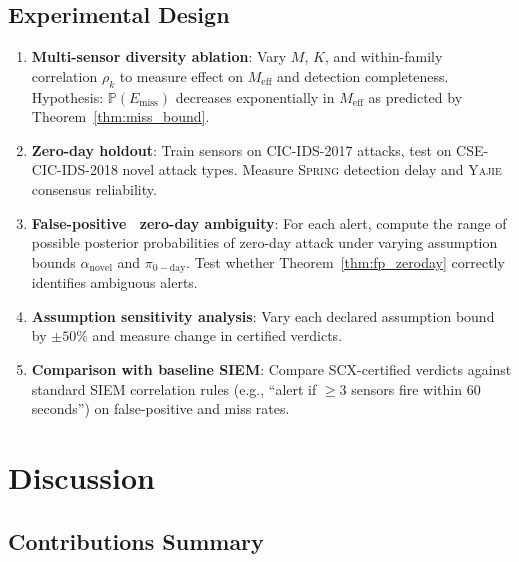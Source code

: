 \documentclass[11pt,a4paper]{article}
\theoremstyle{definition}
\theoremstyle{remark}
\newcommand{\Yajie}{\textsc{Yajie}}
\newcommand{\Spring}{\textsc{Spring}}
\newcommand{\Pbb}{\mathbb{P}}
\newcommand{\zeroday}{\mathrm{0-day}}
\begin{document}
\subsection{Experimental Design }

\begin{enumerate}[label=\textbf{Experiment \arabic*:}, nosep]
    \item \textbf{Multi-sensor diversity ablation}: Vary $M$, $K$, and within-family correlation $\rho_k$ to measure effect on $M_{\mathrm{eff}}$ and detection completeness. Hypothesis: $\Pbb(E_{\mathrm{miss}})$ decreases exponentially in $M_{\mathrm{eff}}$ as predicted by Theorem~\ref{thm:miss_bound}.
    \item \textbf{Zero-day holdout}: Train sensors on CIC-IDS-2017 attacks, test on CSE-CIC-IDS-2018 novel attack types. Measure \Spring{} detection delay and \Yajie{} consensus reliability.
    \item \textbf{False-positive \vs\ zero-day ambiguity}: For each alert, compute the range of possible posterior probabilities of zero-day attack under varying assumption bounds $\alpha_{\mathrm{novel}}$ and $\pi_{\zeroday}$. Test whether Theorem~\ref{thm:fp_zeroday} correctly identifies ambiguous alerts.
    \item \textbf{Assumption sensitivity analysis}: Vary each declared assumption bound by $\pm 50\%$ and measure change in certified verdicts.
    \item \textbf{Comparison with baseline SIEM}: Compare SCX-certified verdicts against standard SIEM correlation rules (e.g., ``alert if $\geq 3$ sensors fire within 60 seconds'') on false-positive and miss rates.
\end{enumerate}

\section{Discussion }
\label{sec:discussion}

\subsection{Contributions Summary }
\end{document}
